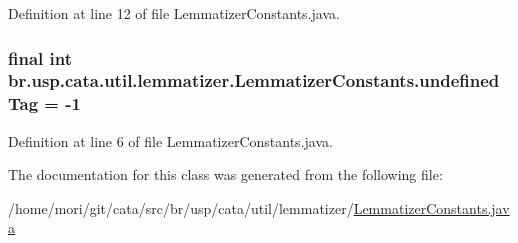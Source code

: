 Definition at line 12 of file Lemmatizer\+Constants.\+java.

\hypertarget{classbr_1_1usp_1_1cata_1_1util_1_1lemmatizer_1_1_lemmatizer_constants_ab7c088342ef43673375550f8c0332ee4}{
\subsubsection[{undefined\+Tag}]{\setlength{\rightskip}{0pt plus 5cm}final int br.\+usp.\+cata.\+util.\+lemmatizer.\+Lemmatizer\+Constants.\+undefined\+Tag = -\/1\hspace{0.3cm}{\ttfamily [static]}}}\label{classbr_1_1usp_1_1cata_1_1util_1_1lemmatizer_1_1_lemmatizer_constants_ab7c088342ef43673375550f8c0332ee4}


Definition at line 6 of file Lemmatizer\+Constants.\+java.



The documentation for this class was generated from the following file\+:\begin{DoxyCompactItemize}
\item 
/home/mori/git/cata/src/br/usp/cata/util/lemmatizer/\hyperlink{_lemmatizer_constants_8java}{Lemmatizer\+Constants.\+java}\end{DoxyCompactItemize}
